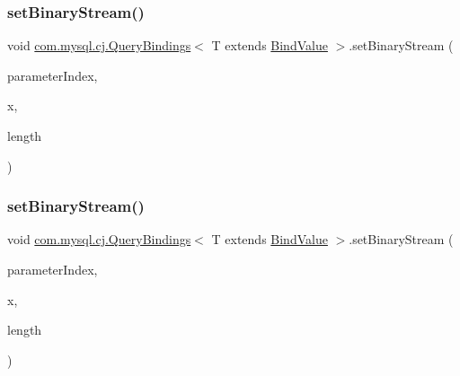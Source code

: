 \subsubsection{\texorpdfstring{set\+Binary\+Stream()}{setBinaryStream()}\hspace{0.1cm}{\footnotesize\ttfamily [2/3]}}
{\footnotesize\ttfamily void \mbox{\hyperlink{interfacecom_1_1mysql_1_1cj_1_1_query_bindings}{com.\+mysql.\+cj.\+Query\+Bindings}}$<$ T extends \mbox{\hyperlink{interfacecom_1_1mysql_1_1cj_1_1_bind_value}{Bind\+Value}} $>$.set\+Binary\+Stream (\begin{DoxyParamCaption}\item[{int}]{parameter\+Index,  }\item[{Input\+Stream}]{x,  }\item[{int}]{length }\end{DoxyParamCaption})}

\mbox{\label{interfacecom_1_1mysql_1_1cj_1_1_query_bindings_a65ca2a3794efcd8c908d80afb950f495}} 
\subsubsection{\texorpdfstring{set\+Binary\+Stream()}{setBinaryStream()}\hspace{0.1cm}{\footnotesize\ttfamily [3/3]}}
{\footnotesize\ttfamily void \mbox{\hyperlink{interfacecom_1_1mysql_1_1cj_1_1_query_bindings}{com.\+mysql.\+cj.\+Query\+Bindings}}$<$ T extends \mbox{\hyperlink{interfacecom_1_1mysql_1_1cj_1_1_bind_value}{Bind\+Value}} $>$.set\+Binary\+Stream (\begin{DoxyParamCaption}\item[{int}]{parameter\+Index,  }\item[{Input\+Stream}]{x,  }\item[{long}]{length }\end{DoxyParamCaption})}

\mbox{\label{interfacecom_1_1mysql_1_1cj_1_1_query_bindings_a1311e39a424947e23b0230c23402f788}} 
